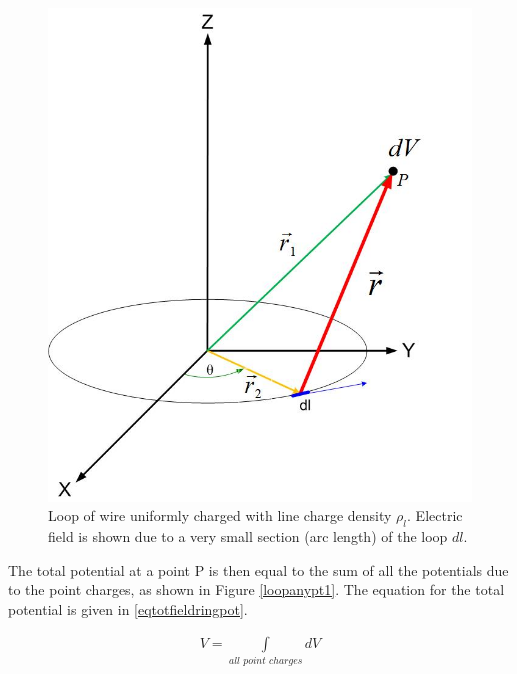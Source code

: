 \documentclass{ximera}
\begin{document}
\begin{figure}[htbp]
\begin{center}
\includegraphics[scale=0.3]{../jpg/Charge_Distributionanypointpot.jpg}
\end{center}
\caption{Loop of wire uniformly charged with line charge density $\rho_l$. Electric field is shown due to a very small section (arc length) of the loop $dl$.}
\label{loopanyptf}
\end{figure}

The total potential at a point P is then equal to the sum of all the potentials due to the point charges, as shown in Figure \ref{loopanypt1}. The equation for the total potential is given in \ref{eqtotfieldringpot}. 

\begin{eqnarray}
V=\int\limits_{all \,\, point \,\, charges} dV \label{eqtotfieldringpot}
\end{eqnarray}
\end{document}
